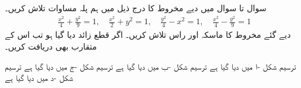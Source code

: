 سوال  تا سوال  میں دیے مخروط کا درج ذیل میں ہم پلہ مساوات تلاش کریں۔
\begin{align*}
\frac{x^2}{4}+\frac{y^2}{9}=1,\quad \frac{x^2}{2}+y^2=1,\quad \frac{y^2}{4}-x^2=1,\quad \frac{x^2}{4}-\frac{y^2}{9}=1
\end{align*}
دیے گئے مخروط کا ماسکہ اور راس تلاش کریں۔ اگر قطع زائد دیا گیا ہو تب اس کے متقارب بھی دریافت کریں۔

ترسیم شکل -ا میں دیا گیا ہے
ترسیم شکل -ب میں دیا گیا ہے
ترسیم شکل -ج میں دیا گیا ہے
ترسیم شکل -د میں دیا گیا ہے
